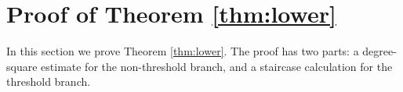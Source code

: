 \documentclass[10pt,a4paper]{article}
\begin{document}







\section{Proof of Theorem \ref{thm:lower}}\label{sec:lower}

In this section we prove Theorem \ref{thm:lower}.  The proof has two parts: a degree-square estimate for the non-threshold branch, and a staircase calculation for the threshold branch.
\end{document}
